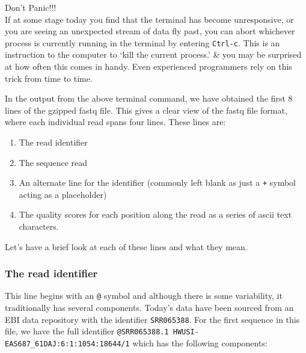 \begin{warning}
\large{Don't Panic!!!} \\
\normalsize
If at some stage today you find that the terminal has become unresponsive, or you are seeing an unexpected stream of data fly past, you can abort whichever process is currently running in the terminal by entering \texttt{Ctrl-c}.
This is an instruction to the computer to `kill the current process.' \& you may be surprised at how often this comes in handy.
Even experienced programmers rely on this trick from time to time.
\end{warning}

\begin{note}
In the output from the above terminal command, we have obtained the first 8 lines of the gzipped fastq file.
This gives a clear view of the fastq file format, where each individual read spans four lines.
These lines are:
\begin{enumerate}
\item The read identifier
\item The sequence read
\item An alternate line for the identifier (commonly left blank as just a \texttt{+} symbol acting as a placeholder)
\item The quality scores for each position along the read as a series of ascii text characters.
\end{enumerate}
\end{note}

Let's have a brief look at each of these lines and what they mean.\\

\subsubsection*{The read identifier}
This line begins with an \texttt{@} symbol and although there is some variability, it traditionally has several components.
Today's data have been sourced from an EBI data repository with the identifier \texttt{SRR065388}.
For the first sequence in this file, we have the full identifier \texttt{@SRR065388.1 HWUSI-EAS687_61DAJ:6:1:1054:18644/1} which has the following components: \\

